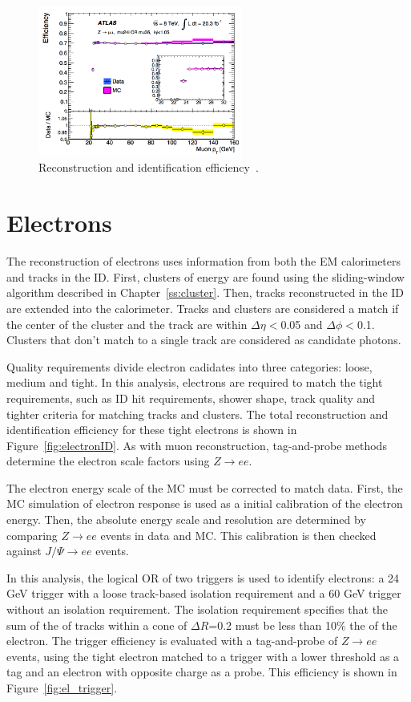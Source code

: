 \begin{figure}[hp]
\centering
\includegraphics[width=0.6\textwidth]{fig/obj/muontrigger.png}
\caption{Reconstruction and identification efficiency~\cite{Aad:2014fxa}.}
\label{fig:muontrigger}
\end{figure}

\section{Electrons}
The reconstruction of electrons uses information from both the EM calorimeters and tracks in the ID. First, clusters of energy are found using the sliding-window algorithm described in Chapter~\ref{ss:cluster}. Then, tracks reconstructed in the ID are extended into the calorimeter. Tracks and clusters are considered a match if the center of the cluster and the track are within $\Delta\eta<$0.05 and $\Delta\phi<$0.1. Clusters that don't match to a single track are considered as candidate photons. 

Quality requirements divide electron cadidates into three categories: loose, medium and tight. In this analysis, electrons are required to match the tight requirements, such as ID hit requirements, shower shape, track quality and tighter criteria for matching tracks and clusters. The total reconstruction and identification efficiency for these tight electrons is shown in Figure~\ref{fig:electronID}. As with muon reconstruction, tag-and-probe methods determine the electron scale factors using $Z\rightarrow ee$.

The electron energy scale of the MC must be corrected to match data. First, the MC simulation of electron response is used as a initial calibration of the electron energy. Then, the absolute energy scale and resolution are determined by comparing $Z\rightarrow ee$ events in data and MC. This calibration is then checked against $J/\Psi\rightarrow ee$ events.

In this analysis, the logical OR of two triggers is used to identify electrons: a 24 GeV trigger with a loose track-based isolation requirement and a 60 GeV trigger without an isolation requirement. The isolation requirement specifies that the sum of the \pt of tracks within a cone of $\Delta R$=0.2 must be less than 10\% the \pt of the electron. The trigger efficiency is evaluated with a tag-and-probe of $Z\rightarrow ee$ events, using the tight electron matched to a trigger with a lower threshold as a tag and an electron with opposite charge as a probe. This efficiency is shown in Figure~\ref{fig:el_trigger}.

